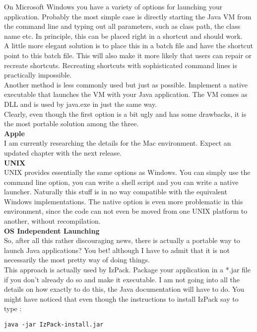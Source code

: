 On Microsoft Windows you have a variety of options for launching your
application. Probably the most simple case is directly starting the Java
VM from the command line and typing out all parameters, such as class
path, the class name etc. In principle, this can be placed right in a
shortcut and should work.\\

A little more elegant solution is to place this in a batch file and have
the shortcut point to this batch file. This will also make it more
likely that users can repair or recreate shortcuts. Recreating shortcuts
with sophisticated command lines is practically impossible.\\

Another method is less commonly used but just as possible. Implement a
native executable that launches the VM with your Java application. The
VM comes as DLL and is used by java.exe in just the same way.\\

Clearly, even though the first option is a bit ugly and has some
drawbacks, it is the most portable solution among the three.\\

\textbf{Apple}\\

I am currently researching the details for the Mac environment. Expect
an updated chapter with the next release.\\

\textbf{UNIX}\\

UNIX provides essentially the same options as Windows. You can simply
use the command line option, you can write a shell script and you can
write a native launcher. Naturally this stuff is in no way compatible
with the equivalent Windows implementations. The native option is even
more problematic in this environment, since the code can not even be
moved from one UNIX platform to another, without recompilation.\\

\textbf{OS Independent Launching}\\

So, after all this rather discouraging news, there is actually a
portable way to launch Java applications? You bet! although I have to
admit that it is not necessarily the most pretty way of doing things.\\

This approach is actually used by IzPack. Package your application in a
*.jar file if you don't already do so and make it executable. I am not
going into all the details on how exactly to do this, the Java
documentation will have to do. You might have noticed that even though
the instructions to install IzPack say to type :
\begin{verbatim}
java -jar IzPack-install.jar
\end{verbatim}\\

